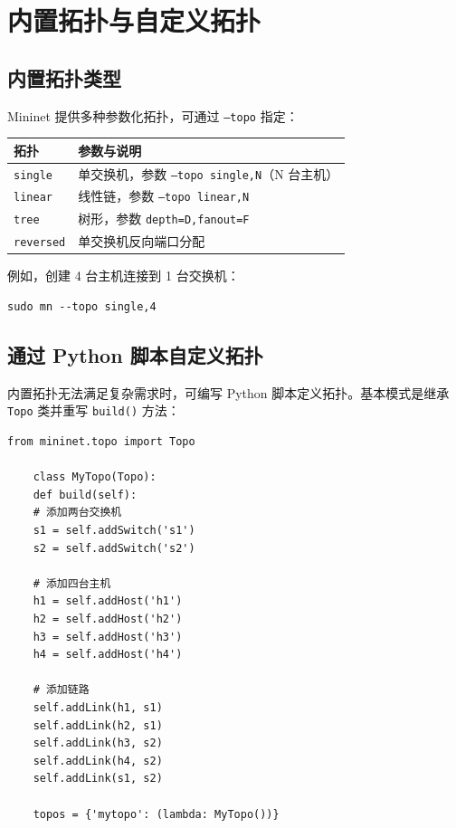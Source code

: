 \documentclass[12pt,a4paper,openany]{ctexbook}
\begin{document}
\chapter{内置拓扑与自定义拓扑}

\section{内置拓扑类型}

Mininet 提供多种参数化拓扑，可通过 \texttt{--topo} 指定：

\begin{center}
	\begin{tabular}{@{}ll@{}}
		\toprule
		\textbf{拓扑} & \textbf{参数与说明} \\
		\midrule
		\texttt{single} & 单交换机，参数 \texttt{--topo single,N}（N 台主机） \\
		\texttt{linear} & 线性链，参数 \texttt{--topo linear,N} \\
		\texttt{tree} & 树形，参数 \texttt{depth=D,fanout=F} \\
		\texttt{reversed} & 单交换机反向端口分配 \\
		\bottomrule
	\end{tabular}
\end{center}

例如，创建 4 台主机连接到 1 台交换机：

\begin{lstlisting}[style=bashstyle]
	sudo mn --topo single,4
\end{lstlisting}

\section{通过 Python 脚本自定义拓扑}

内置拓扑无法满足复杂需求时，可编写 Python 脚本定义拓扑。基本模式是继承 \texttt{Topo} 类并重写 \texttt{build()} 方法：

\begin{lstlisting}[style=mininetstyle]
	from mininet.topo import Topo
	
	class MyTopo(Topo):
	def build(self):
	# 添加两台交换机
	s1 = self.addSwitch('s1')
	s2 = self.addSwitch('s2')
	
	# 添加四台主机
	h1 = self.addHost('h1')
	h2 = self.addHost('h2')
	h3 = self.addHost('h3')
	h4 = self.addHost('h4')
	
	# 添加链路
	self.addLink(h1, s1)
	self.addLink(h2, s1)
	self.addLink(h3, s2)
	self.addLink(h4, s2)
	self.addLink(s1, s2)
	
	topos = {'mytopo': (lambda: MyTopo())}
\end{lstlisting}
\end{document}
